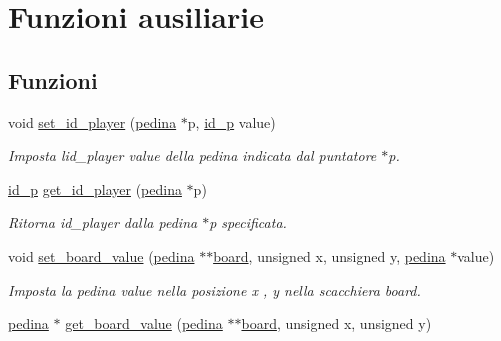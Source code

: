 \hypertarget{group__Ausiliarie}{}\section{Funzioni ausiliarie}
\label{group__Ausiliarie}
\subsection*{Funzioni}
\begin{DoxyCompactItemize}
\item 
void \hyperlink{group__Ausiliarie_gabbdcb7fca0fe313ecc63bc2ba1a73d8e}{set\+\_\+id\+\_\+player} (\hyperlink{ml__lib_8h_a71fee95122b31f5cb0b07d9c16ffa3a5}{pedina} $\ast$p, \hyperlink{ml__lib_8h_a0330ff92cbc796e96c3ce3e4401bf1e1}{id\+\_\+p} value)
\begin{DoxyCompactList}\small\item\em Imposta l\textquotesingle{}id\+\_\+player {\itshape value} della pedina indicata dal puntatore {\itshape $\ast$p}. \end{DoxyCompactList}\item 
\hyperlink{ml__lib_8h_a0330ff92cbc796e96c3ce3e4401bf1e1}{id\+\_\+p} \hyperlink{group__Ausiliarie_gaeebe06189e2bd221a0e65b7d15f6b1b5}{get\+\_\+id\+\_\+player} (\hyperlink{ml__lib_8h_a71fee95122b31f5cb0b07d9c16ffa3a5}{pedina} $\ast$p)
\begin{DoxyCompactList}\small\item\em Ritorna {\itshape id\+\_\+player} dalla pedina {\itshape $\ast$p} specificata. \end{DoxyCompactList}\item 
void \hyperlink{group__Ausiliarie_gaf41d60dd64b7eb3f58f9d47100461310}{set\+\_\+board\+\_\+value} (\hyperlink{ml__lib_8h_a71fee95122b31f5cb0b07d9c16ffa3a5}{pedina} $\ast$$\ast$\hyperlink{ml__main_8c_a62a3fe3d1df9ff58883b669f7f24e516}{board}, unsigned x, unsigned y, \hyperlink{ml__lib_8h_a71fee95122b31f5cb0b07d9c16ffa3a5}{pedina} $\ast$value)
\begin{DoxyCompactList}\small\item\em Imposta la pedina {\itshape value} nella posizione {\itshape x} , {\itshape y} nella scacchiera {\itshape board}. \end{DoxyCompactList}\item 
\hyperlink{ml__lib_8h_a71fee95122b31f5cb0b07d9c16ffa3a5}{pedina} $\ast$ \hyperlink{group__Ausiliarie_ga98af825db34dd320535062aa23675a71}{get\+\_\+board\+\_\+value} (\hyperlink{ml__lib_8h_a71fee95122b31f5cb0b07d9c16ffa3a5}{pedina} $\ast$$\ast$\hyperlink{ml__main_8c_a62a3fe3d1df9ff58883b669f7f24e516}{board}, unsigned x, unsigned y)

\end{DoxyCompactItemize}
